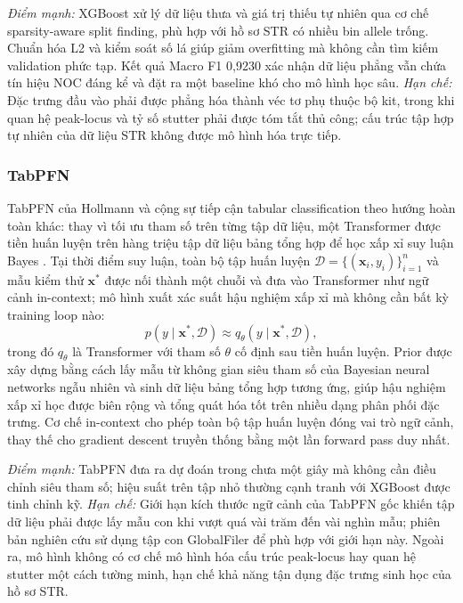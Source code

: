 \documentclass[12pt,a4paper]{article}
\begin{document}
\emph{Điểm mạnh:} XGBoost xử lý dữ liệu thưa và giá trị thiếu tự nhiên qua cơ chế sparsity-aware split finding, phù hợp với hồ sơ STR có nhiều bin allele trống. Chuẩn hóa L2 và kiểm soát số lá giúp giảm overfitting mà không cần tìm kiếm validation phức tạp. Kết quả Macro F1 0,9230 xác nhận dữ liệu phẳng vẫn chứa tín hiệu NOC đáng kể và đặt ra một baseline khó cho mô hình học sâu. \emph{Hạn chế:} Đặc trưng đầu vào phải được phẳng hóa thành véc tơ phụ thuộc bộ kit, trong khi quan hệ peak-locus và tỷ số stutter phải được tóm tắt thủ công; cấu trúc tập hợp tự nhiên của dữ liệu STR không được mô hình hóa trực tiếp.

\subsubsection{TabPFN}

TabPFN của Hollmann và cộng sự tiếp cận tabular classification theo hướng hoàn toàn khác: thay vì tối ưu tham số trên từng tập dữ liệu, một Transformer được tiền huấn luyện trên hàng triệu tập dữ liệu bảng tổng hợp để học xấp xỉ suy luận Bayes \cite{hollmann2023}. Tại thời điểm suy luận, toàn bộ tập huấn luyện $\mathcal{D} = \{(\bm{x}_i, y_i)\}_{i=1}^n$ và mẫu kiểm thử $\bm{x}^*$ được nối thành một chuỗi và đưa vào Transformer như ngữ cảnh in-context; mô hình xuất xác suất hậu nghiệm xấp xỉ mà không cần bất kỳ training loop nào:
\begin{equation}
p(y \mid \bm{x}^*, \mathcal{D}) \approx q_\theta(y \mid \bm{x}^*, \mathcal{D}),
\end{equation}
trong đó $q_\theta$ là Transformer với tham số $\theta$ cố định sau tiền huấn luyện. Prior được xây dựng bằng cách lấy mẫu từ không gian siêu tham số của Bayesian neural networks ngẫu nhiên và sinh dữ liệu bảng tổng hợp tương ứng, giúp hậu nghiệm xấp xỉ học được biên rộng và tổng quát hóa tốt trên nhiều dạng phân phối đặc trưng. Cơ chế in-context cho phép toàn bộ tập huấn luyện đóng vai trò ngữ cảnh, thay thế cho gradient descent truyền thống bằng một lần forward pass duy nhất.

\emph{Điểm mạnh:} TabPFN đưa ra dự đoán trong chưa một giây mà không cần điều chỉnh siêu tham số; hiệu suất trên tập nhỏ thường cạnh tranh với XGBoost được tinh chỉnh kỹ. \emph{Hạn chế:} Giới hạn kích thước ngữ cảnh của TabPFN gốc khiến tập dữ liệu phải được lấy mẫu con khi vượt quá vài trăm đến vài nghìn mẫu; phiên bản nghiên cứu sử dụng tập con GlobalFiler để phù hợp với giới hạn này. Ngoài ra, mô hình không có cơ chế mô hình hóa cấu trúc peak-locus hay quan hệ stutter một cách tường minh, hạn chế khả năng tận dụng đặc trưng sinh học của hồ sơ STR.
\end{document}
